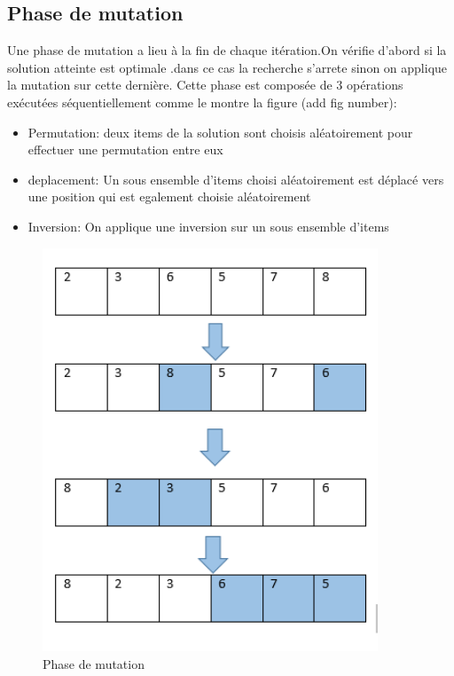 \documentclass[12pt]{article}
\begin{document}
\subsection{Phase de mutation}
Une phase de mutation a lieu à la fin de chaque itération.On vérifie d'abord si la solution atteinte est optimale .dans ce cas la recherche s'arrete sinon on applique la mutation sur cette dernière.
Cette phase est composée de 3 opérations exécutées séquentiellement comme le montre la figure (add fig number): 
\begin{itemize}
    \item Permutation: deux items de la solution sont choisis aléatoirement pour effectuer une permutation entre eux
    \item deplacement: Un sous ensemble d'items choisi aléatoirement est déplacé vers une position qui est egalement choisie aléatoirement
    \item Inversion: On applique une inversion sur un sous ensemble d'items
\end{itemize}
\begin{figure}[h!]
   \centering
    \includegraphics[width=10cm]{../figures/Mutation.PNG}
    \caption[\small]{Phase de mutation}
\end{figure}
\end{document}
